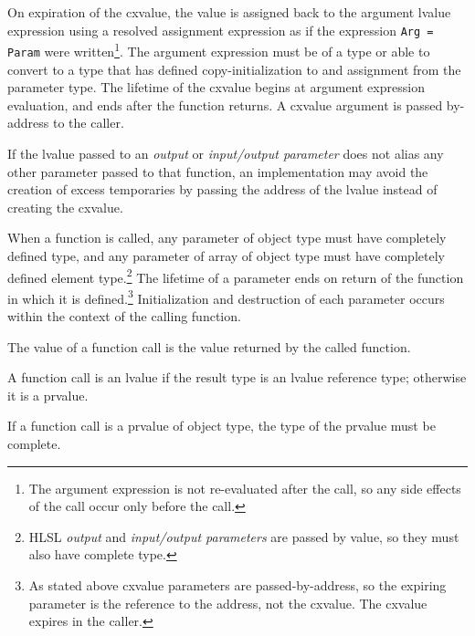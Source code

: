 \p On expiration of the cxvalue, the value is assigned back to the argument
lvalue expression using a resolved assignment expression as if the expression
\texttt{Arg = Param} were written\footnote{The argument expression is not
re-evaluated after the call, so any side effects of the call occur only before
the call.}. The argument expression must be of a type or able to convert to a
type that has defined copy-initialization to and assignment from the parameter
type. The lifetime of the cxvalue begins at argument expression evaluation, and
ends after the function returns. A cxvalue argument is passed by-address to the
caller.

\p If the lvalue passed to an \textit{output} or \textit{input/output parameter}
does not alias any other parameter passed to that function, an implementation
may avoid the creation of excess temporaries by passing the address of the
lvalue instead of creating the cxvalue.

\p When a function is called, any parameter of object type must have completely
defined type, and any parameter of array of object type must have completely
defined element type.\footnote{HLSL \textit{output} and \textit{input/output
parameters} are passed by value, so they must also have complete type.} The
lifetime of a parameter ends on return of the function in which it is
defined.\footnote{As stated above cxvalue parameters are passed-by-address, so
the expiring parameter is the reference to the address, not the cxvalue. The
cxvalue expires in the caller.} Initialization and destruction of each
parameter occurs within the context of the calling function.

\p The value of a function call is the value returned by the called function.

\p A function call is an lvalue if the result type is an lvalue reference type;
otherwise it is a prvalue.

\p If a function call is a prvalue of object type, the type of the prvalue must
be complete.
